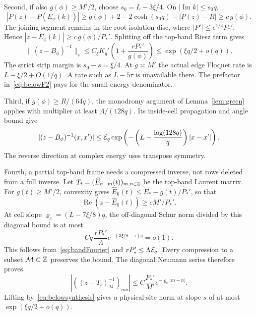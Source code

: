 Second, if also $g(\phi)\ge M'/2$, choose $s_0=L-3\xi/4$. On $|\operatorname{Im}k|\le s_0q$,
\[
 |P(z)-P(E_\phi(k))|
 \ge g(\phi)+2-2\cosh(s_0q)-|P(z)-R|\ge c\,g(\phi).
\]
The joining segment remains in the root-isolation disc, where
$|P'|\le e^{1/4}P_*'$. Hence
$|z-E_\phi(k)|\ge c\,g(\phi)/P_*'$. Splitting off the top-band Riesz term gives
\begin{equation}\label{eq:belowF2}
 \|(z-B_\phi)^{-1}\|_s
 \le C_\xi K_q'\left(1+\frac{rP_*'}{g(\phi)}\right)
 \le \exp(\xi q/2+o(q)).
\end{equation}
The strict strip margin is $s_0-s=\xi/4$. At $g\asymp M'$ the actual edge Floquet rate is $L-\xi/2+O(1/q)$. A rate such as $L-5\tau$ is unavailable there. The prefactor in~\eqref{eq:belowF2} pays for the small energy denominator.

Third, if $g(\phi)\ge R/(64q)$, the monodromy argument of Lemma~\ref{lem:green} applies with multiplier at least $\Lambda/(128q)$. Its inside-cell propagation and angle bound give
\begin{equation}\label{eq:belowF3}
 |(z-B_\phi)^{-1}(x,x')|
 \le\mathcal E_q\exp\left(-\left(L-\frac{\log(128q)}q\right)|x-x'|\right).
\end{equation}
The reverse direction at complex energy uses transpose symmetry.

Fourth, a partial top-band frame needs a compressed inverse, not rows deleted from a full inverse. Let $T_t=(\widehat E_{n-m}(t))_{m,n\in\mathbb Z}$ be the top-band Laurent matrix. For $g(t)\ge M'/2$, convexity gives
$\widehat E_0(t)\le E_*-g(t)/P_*'$, so that
\[
 \operatorname{Re}(z-\widehat E_0(t))\ge cM'/P_*'.
\]
At cell slope $\varrho_c=(L-7\xi/8)q$, the off-diagonal Schur norm divided by this diagonal bound is at most
\[
 Cq\,\frac{rP_*'}{\Lambda}
           e^{-(3\xi/8-\tau)q}=o(1).
\]
This follows from~\eqref{eq:bandFourier} and $rP_*'\le\Lambda\mathcal E_q$.
Every compression to a subset $\mathcal M\subset\mathbb Z$ preserves the bound. The diagonal Neumann series therefore proves
\begin{equation}\label{eq:belowF4}
 |((z-T_t)_{\mathcal M}^{-1})_{mn}|
 \le C\frac{P_*'}{M'}e^{-\varrho_c|m-n|}.
\end{equation}
Lifting by~\eqref{eq:belowsynthesis} gives a physical-site norm at slope $s$ of at most $\exp(\xi q/2+o(q))$.

